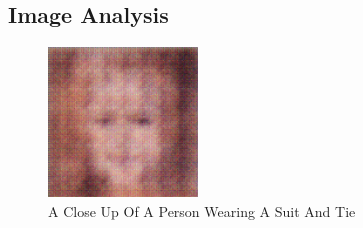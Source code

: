 \documentclass{article}%
\begin{document}
%
\subsection{Image Analysis}%
\label{subsec:ImageAnalysis}%


\begin{figure}[h!]%
\centering%
\includegraphics[width=150px]{500_fake_images/samples_5_182.png}%
\caption{A Close Up Of A Person Wearing A Suit And Tie}%
\end{figure}

%
\end{document}
